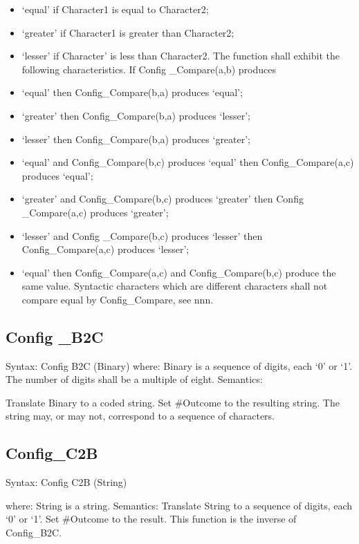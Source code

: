\begin{itemize}
\item
  `equal' if Character1 is equal to Character2;
\item
  `greater' if Character1 is greater than Character2;
\item
  `lesser' if Character' is less than Character2. The function shall
  exhibit the following characteristics. If Config \_Compare(a,b)
  produces
\item
  `equal' then Config\_Compare(b,a) produces `equal';
\item
  `greater' then Config\_Compare(b,a) produces `lesser';
\item
  `lesser' then Config\_Compare(b,a) produces `greater';
\item
  `equal' and Config\_Compare(b,c) produces `equal' then
  Config\_Compare(a,c) produces `equal';
\item
  `greater' and Config\_Compare(b,c) produces `greater' then Config
  \_Compare(a,c) produces `greater';
\item
  `lesser' and Config \_Compare(b,c) produces `lesser' then
  Config\_Compare(a,c) produces `lesser';
\item
  `equal' then Config\_Compare(a,c) and Config\_Compare(b,c) produce the
  same value. Syntactic characters which are different characters shall
  not compare equal by Config\_Compare, see nnn.
\end{itemize}

\subsection{Config \_B2C}\label{config-_b2c}

Syntax: Config B2C (Binary) where: Binary is a sequence of digits, each
`0' or `1'. The number of digits shall be a multiple of eight.
Semantics:

Translate Binary to a coded string. Set \#Outcome to the resulting
string. The string may, or may not, correspond to a sequence of
characters.

\subsection{Config\_C2B}\label{config_c2b}

Syntax: Config C2B (String)

where: String is a string. Semantics: Translate String to a sequence of
digits, each `0' or `1'. Set \#Outcome to the result. This function is
the inverse of Config\_B2C.

